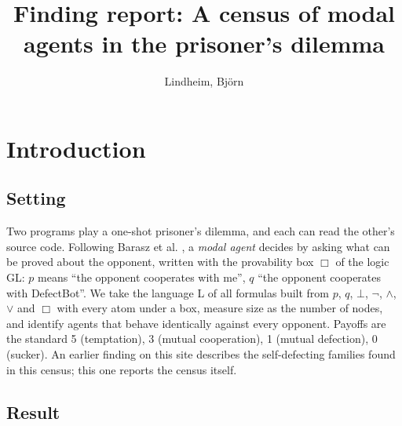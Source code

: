 \documentclass{article}
\title{Finding report: A census of modal agents in the prisoner's dilemma}
\author{Lindheim, Björn}
\date{}
\begin{document}
\maketitle
\section{Introduction}
\label{sec:modal-agent-census}

\subsection*{Setting}

Two programs play a one-shot prisoner's dilemma, and each can read the other's source code.
Following Barasz et al. \cite{barasz2014robust}, a \emph{modal agent} decides by asking what can be proved
about the opponent, written with the provability box $\Box$ of the logic GL: $p$ means ``the
opponent cooperates with me'', $q$ ``the opponent cooperates with DefectBot''. We take the language
L of all formulas built from $p$, $q$, $\bot$, $\neg$, $\wedge$, $\vee$ and $\Box$ with every atom
under a box, measure size as the number of nodes, and identify agents that behave identically
against every opponent. Payoffs are the standard 5 (temptation), 3 (mutual cooperation), 1
(mutual defection), 0 (sucker). An earlier finding on this site describes the self-defecting
families found in this census; this one reports the census itself.

\subsection*{Result}
\end{document}
